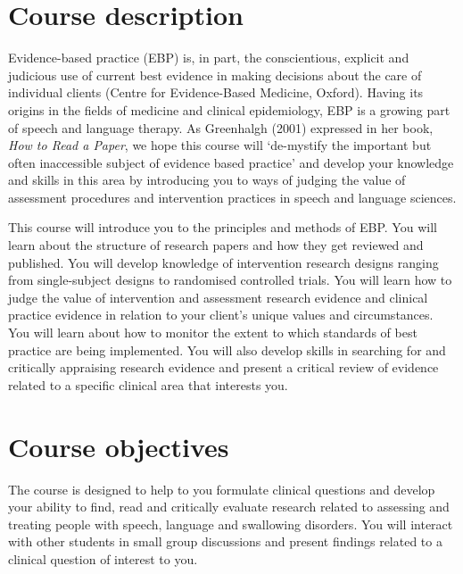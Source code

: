 \documentclass[a4paper, 11pt]{article}
\newcommand{\blankline}{\quad\pagebreak[2]}
\begin{document}

\blankline

\section*{Course description}

Evidence-based practice (EBP) is, in part, the conscientious, explicit and judicious use of current best evidence in making decisions about the care of individual clients (Centre for Evidence-Based Medicine, Oxford). Having its origins in the fields of medicine and clinical epidemiology, EBP is a growing part of speech and language therapy. As Greenhalgh (2001) expressed in her book, \emph{How to Read a Paper}, we hope this course will `de-mystify the important but often inaccessible subject of evidence based practice' and develop your knowledge and skills in this area by introducing you to ways of judging the value of assessment procedures and intervention practices in speech and language sciences.

This course will introduce you to the principles and methods of EBP. You will learn
about the structure of research papers and how they get reviewed and published. You will develop knowledge of
intervention research designs ranging from single-subject designs to randomised controlled trials. You will
learn how to judge the value of intervention and assessment research evidence and clinical practice evidence in
relation to your client's unique values and circumstances. 
You will learn about how to monitor the extent to which standards of best practice are being implemented. 
You will also develop skills in searching for and critically appraising research evidence and present a critical review of evidence related to a specific clinical area that interests  you.

\section*{Course objectives}
The course is designed to help to you formulate clinical questions and develop your ability to find, read and critically
evaluate research related to assessing and treating people with speech, language and swallowing disorders. You will
interact with other students in small group discussions and present findings related to a clinical question of interest
to you.
\end{document}
